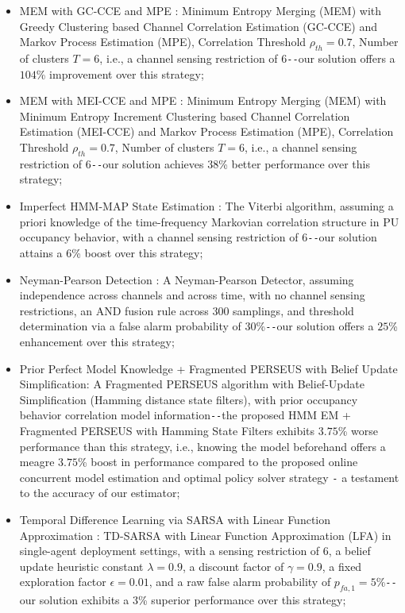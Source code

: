 \documentclass[10pt, twocolumn]{IEEEtran}
\begin{document}
\begin{itemize}
    \item MEM with GC-CCE and MPE \cite{WCL:7}: Minimum Entropy Merging (MEM) with Greedy Clustering based Channel Correlation Estimation (GC-CCE) and Markov Process Estimation (MPE), Correlation Threshold $\rho_{th}{=}0.7$, Number of clusters $T{=}6$, i.e., a channel sensing restriction of $6$\texttt{-{}-}our solution offers a $104$\% improvement over this strategy;
    \item MEM with MEI-CCE and MPE \cite{WCL:7}: Minimum Entropy Merging (MEM) with Minimum Entropy Increment Clustering based Channel Correlation Estimation (MEI-CCE) and Markov Process Estimation (MPE), Correlation Threshold $\rho_{th}{=}0.7$, Number of clusters $T{=}6$, i.e., a channel sensing restriction of $6$\texttt{-{}-}our solution achieves $38$\% better performance over this strategy;
    \item Imperfect HMM-MAP State Estimation \cite{WCL:6}: The Viterbi algorithm, assuming a priori knowledge of the time-frequency Markovian correlation structure in PU occupancy behavior, with a channel sensing restriction of $6$\texttt{-{}-}our solution attains a $6$\% boost over this strategy;
    \item Neyman-Pearson Detection \cite{WCL:11}: A Neyman-Pearson Detector, assuming independence across channels and across time, with no channel sensing restrictions, an AND fusion rule across $300$ samplings, and threshold determination via a false alarm probability of $30$\%\texttt{-{}-}our solution offers a $25$\% enhancement over this strategy;
    \item Prior Perfect Model Knowledge + Fragmented PERSEUS with Belief Update Simplification: A Fragmented PERSEUS algorithm with Belief-Update Simplification (Hamming distance state filters), with prior occupancy behavior correlation model information\texttt{-{}-}the proposed HMM EM + Fragmented PERSEUS with Hamming State Filters exhibits $3.75$\% worse performance than this strategy, i.e., knowing the model beforehand offers a meagre $3.75$\% boost in performance compared to the proposed online concurrent model estimation and optimal policy solver strategy \texttt{-} a testament to the accuracy of our estimator;
    \item Temporal Difference Learning via SARSA with Linear Function Approximation \cite{WCL:5}: TD-SARSA with Linear Function Approximation (LFA) in single-agent deployment settings, with a sensing restriction of $6$, a belief update heuristic constant $\lambda{=}0.9$, a discount factor of $\gamma{=}0.9$, a fixed exploration factor $\epsilon{=}0.01$, and a raw false alarm probability of $p_{fa,1}{=}5$\%\texttt{-{}-}our solution exhibits a $3$\% superior performance over this strategy;

\end{itemize}
\end{document}
